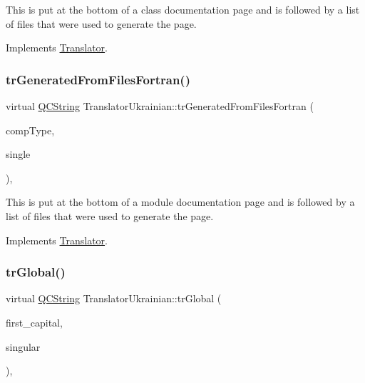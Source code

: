 This is put at the bottom of a class documentation page and is followed by a list of files that were used to generate the page. 

Implements \mbox{\hyperlink{class_translator}{Translator}}.

\mbox{\label{class_translator_ukrainian_a84c299c165bdf4a9e175c66eb762cffa}} 
\subsubsection{\texorpdfstring{trGeneratedFromFilesFortran()}{trGeneratedFromFilesFortran()}}
{\footnotesize\ttfamily virtual \mbox{\hyperlink{class_q_c_string}{Q\+C\+String}} Translator\+Ukrainian\+::tr\+Generated\+From\+Files\+Fortran (\begin{DoxyParamCaption}\item[{\mbox{\hyperlink{class_class_def_ae70cf86d35fe954a94c566fbcfc87939}{Class\+Def\+::\+Compound\+Type}}}]{comp\+Type,  }\item[{bool}]{single }\end{DoxyParamCaption})\hspace{0.3cm}{\ttfamily [inline]}, {\ttfamily [virtual]}}

This is put at the bottom of a module documentation page and is followed by a list of files that were used to generate the page. 

Implements \mbox{\hyperlink{class_translator}{Translator}}.

\mbox{\label{class_translator_ukrainian_acea284fb5ae0446cd47b5b052a4f174a}} 
\subsubsection{\texorpdfstring{trGlobal()}{trGlobal()}}
{\footnotesize\ttfamily virtual \mbox{\hyperlink{class_q_c_string}{Q\+C\+String}} Translator\+Ukrainian\+::tr\+Global (\begin{DoxyParamCaption}\item[{bool}]{first\+\_\+capital,  }\item[{bool}]{singular }\end{DoxyParamCaption})\hspace{0.3cm}{\ttfamily [inline]}, {\ttfamily [virtual]}}

